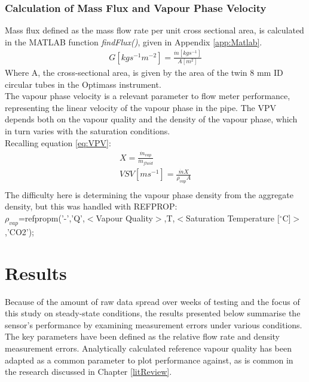 \documentclass{report}
\begin{document}
\subsection{Calculation of Mass Flux and Vapour Phase Velocity}
Mass flux defined as the mass flow rate per unit cross sectional area, is calculated in the MATLAB function \textit{findFlux()}, given in Appendix \ref{app:Matlab}.
\begin{eqnarray}
G [kgs^{-1}m^{-2}]=\frac{\dot{m}[kgs^{-1}]}{A[m^2]}
\end{eqnarray}
Where A, the cross-sectional area, is given by the area of the twin 8 mm ID circular tubes in the Optimass instrument.\\
The vapour phase velocity is a relevant parameter to flow meter performance, representing the linear velocity of the vapour phase in the pipe. The VPV depends both on the vapour quality  and the density of the vapour phase, which in turn varies with the saturation conditions.\\
Recalling equation \ref{eq:VPV}:
\begin{eqnarray}
X=\frac{\dot{m}_{vap}}{\dot{m}_{fluid}}\\
VSV[ms^{-1}]=\frac{\dot{m}X}{\rho_{vap}A} \\
\end{eqnarray}
The difficulty here is determining the vapour phase density from the aggregate density, but this was handled with REFPROP:\\
$\rho_{vap}$=refpropm('-','Q',$<$Vapour Quality$>$,T,$<$Saturation Temperature [$^\circ$C]$>$,'CO2');

\chapter{Results} \label{results}
Because of the amount of raw data spread over weeks of testing and the focus of this study on steady-state conditions, the results presented below summarise the sensor's performance by examining measurement errors under various conditions. The key parameters have been defined as the relative flow rate and density measurement errors. Analytically calculated reference vapour quality has been adapted as a common parameter to plot performance against, as is common in the research discussed in Chapter \ref{litReview}.
\end{document}
